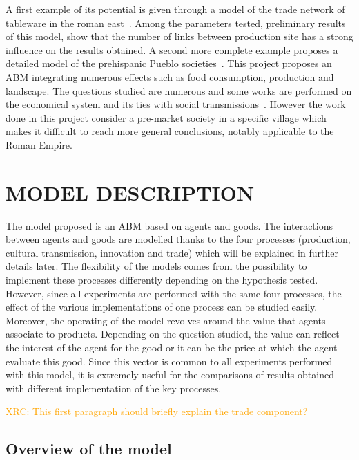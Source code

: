\documentclass{wscpaperproc}
\newcommand{\memo}[2]{\textcolor{#1}{#2}}
\newcommand{\xrc}[1]{\memo{orange}{XRC: #1\\}}
\begin{document}
A first example of its potential is given through a model of the trade network of tableware in the roman east~\cite{brughmans_roman_2014}. Among the parameters tested, preliminary results of this model, show that the number of links between production site has a strong influence on the results obtained. A second more complete example proposes a detailed model of the prehispanic Pueblo societies~\cite{kohler_modelling_2012}. This project proposes an ABM integrating numerous effects such as food consumption, production and landscape. The questions studied are  numerous and some works are performed on the economical system and its ties with social transmissions~\cite{kobti_emergence_2006,cockburn_simulating_2013}. However the work done in this project consider a pre-market society in a specific village which makes it difficult to reach more general conclusions, notably applicable to the Roman Empire.






\section{MODEL DESCRIPTION}

The model proposed is an ABM based on agents and goods. The interactions between agents and goods are modelled thanks to the four processes (production, cultural transmission, innovation and trade) which will be explained in further details later. The flexibility of the models comes from the possibility to implement these processes differently depending on the hypothesis tested. However, since all experiments are performed with the same four processes, the effect of the various implementations of one process can be studied easily. Moreover, the operating of the model revolves around the value that agents associate to products. Depending on the question studied, the value can reflect the interest of the agent for the good or it can be the price at which the agent evaluate this good. Since this vector is common to all experiments performed with this model, it is extremely useful for the comparisons of results obtained with different implementation of the key processes.

\xrc{This first paragraph should briefly explain the trade component?}

\subsection{Overview of the model}
\end{document}
